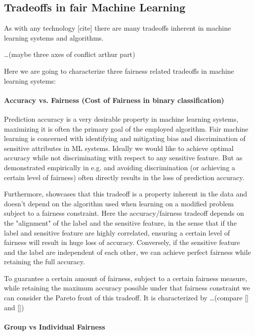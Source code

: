 	\subsection{Tradeoffs in fair Machine Learning}
	As with any technology [cite] there are many tradeoffs inherent in machine learning systems and algorithms.

	\dots (maybe three axes of conflict arthur part)

	Here we are going to characterize three fairness related tradeoffs in machine learning systems:
	
	\paragraph{Accuracy vs. Fairness (Cost of Fairness in binary classification)}
	Prediction accuracy is a very desirable property in machine learning systems, maximizing it is often the primary goal of the employed algorithm.
	Fair machine learning is concerned with identifying and mitigating bias and discrimination of sensitive attributes in ML systems.
	Ideally we would like to achieve optimal accuracy while not discriminating with respect to any sensitive feature.
	But as demonstrated empirically in e.g. \cite{kamiran2010discrimination} and \cite{zliobaite2015relation} avoiding discrimination (or achieving a certain level of fairness) often directly results in the loss of prediction accuracy.

	Furthermore, \cite{menon2018cost} showcases that this tradeoff is a property inherent in the data and doesn't depend on the algorithm used when learning on a modified problem subject to a fairness constraint.
	Here the accuracy/fairness tradeoff depends on the "alignment" of the label and the sensitive feature, in the sense that if the label and sensitive feature are highly correlated, ensuring a certain level of fairness will result in huge loss of accuracy.
	Conversely, if the sensitive feature and the label are independent of each other, we can achieve perfect fairness while retaining the full accuracy.
	
	To guarantee a certain amount of fairness, subject to a certain fairness measure, while retaining the maximum accuracy possible under that fairness constraint we can consider the Pareto front of this tradeoff. 	
	It  is characterized by \dots (compare [] and [])


	\paragraph{Group vs Individual Fairness}
	
